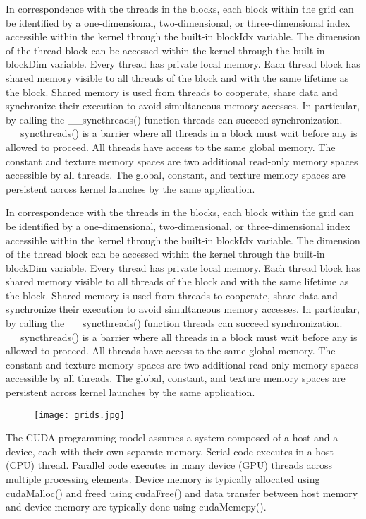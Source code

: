 In correspondence with the threads in the blocks, each block within the grid can be identified by a one-dimensional, two-dimensional, or three-dimensional index accessible within the kernel through the built-in blockIdx variable. The dimension of the thread block can be accessed within the kernel through the built-in blockDim variable. 
Every thread has private local memory. Each thread block has shared memory visible to all threads of the block and with the same lifetime as the block. Shared memory is used from threads to cooperate, share data and synchronize their execution to avoid simultaneous memory accesses. In particular, by calling the \_\_syncthreads() function threads can succeed synchronization.  \_\_syncthreads() is a barrier where all threads in a block must wait before any is allowed to proceed. All threads have access to the same global memory. The constant and texture memory spaces are two additional read-only memory spaces accessible by all threads. The global, constant, and texture memory spaces are persistent across kernel launches by the same application. 


In correspondence with the threads in the blocks, each block within the grid can be identified by a one-dimensional, two-dimensional, or three-dimensional index accessible within the kernel through the built-in blockIdx variable. The dimension of the thread block can be accessed within the kernel through the built-in blockDim variable. Every thread has private local memory. Each thread block has shared memory visible to all threads of the block and with the same lifetime as the block. Shared memory is used from threads to cooperate, share data and synchronize their execution to avoid simultaneous memory accesses. In particular, by calling the \_\_syncthreads() function threads can succeed  synchronization. \_\_syncthreads() is a barrier where all threads in a block must wait before any is allowed to proceed. All threads have access to the same global memory. The constant and texture memory spaces are two additional read-only memory spaces accessible by all threads. The global, constant, and texture memory spaces are persistent across kernel launches by the same application. 

 \begin{figure}[H]
    \centering
        \texttt{[image: grids.jpg]}
    \caption{}
    \label{fig:warp_scheduler}
\end{figure}

The CUDA programming model assumes a system composed of a host and a device, each with their own separate memory. Serial code executes in a host (CPU) thread. Parallel code executes in many device (GPU) threads across multiple processing elements. Device memory is typically allocated using cudaMalloc() and freed using cudaFree() and data transfer between host memory and device memory are typically done using cudaMemcpy(). 

